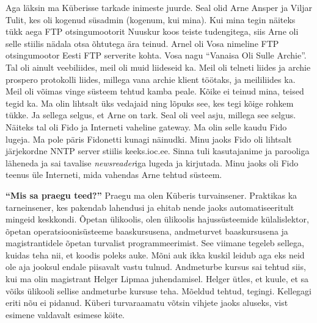 Aga läksin ma Küberisse tarkade inimeste juurde. Seal olid Arne Ansper ja Viljar Tulit, kes oli kogenud süsadmin (kogenum, kui mina). Kui mina tegin näiteks tükk aega FTP otsingumootorit Nuuskur koos teiste tudengitega, siis Arne oli selle stiilis nädala otsa õhtutega ära teinud. Arnel oli Vosa nimeline FTP otsingumootor Eesti FTP serverite kohta. Vosa nagu \enquote{Vanaisa Oli Sulle Archie}. Tal oli ainult veebiliides, meil oli muid liideseid ka. Meil oli telneti liides ja archie prospero protokolli liides, millega vana archie klient töötaks, ja meililiides ka. Meil oli võimas vinge süsteem tehtud kamba peale. Kõike ei teinud mina, teised tegid ka. Ma olin lihtsalt üks vedajaid ning lõpuks see, kes tegi kõige rohkem tükke. Ja sellega selgus, et Arne on tark. Seal oli veel asju, millega see selgus. Näiteks tal oli Fido ja Interneti vaheline gateway. Ma olin selle kaudu Fido lugeja. Ma pole päris Fidonetti kunagi näinudki. Minu jaoks Fido oli lihtsalt järjekordne NNTP server stiilis keeks.ioc.ee. Sinna tuli kasutajanime ja parooliga läheneda ja sai tavalise \emph{newsreader}iga lugeda ja kirjutada. Minu jaoks oli Fido teenus üle Interneti, mida vahendas Arne tehtud süsteem. 

\textbf{\enquote{Mis sa praegu teed?}}
Praegu ma olen Küberis turvainsener. Praktikas ka tarneinsener, kes pakendab lahendusi ja ehitab nende jaoks automatiseeritult mingeid keskkondi. Õpetan ülikoolis, olen ülikoolis hajussüsteemide külalislektor, õpetan operatsioonisüsteeme baaskursusena, andmeturvet baaskursusena ja magistrantidele õpetan turvalist programmeerimist. See viimane tegeleb sellega, kuidas teha nii, et koodis poleks auke. Mõni auk ikka kuskil leidub aga eks neid ole aja jooksul endale piisavalt vastu tulnud. Andmeturbe kursus sai tehtud siis, kui ma olin magistrant Helger Lipmaa juhendamisel. Helger ütles, et kuule, et sa võiks ülikooli  sellise andmeturbe kursuse teha. Mõeldud tehtud, tegingi. Kellegagi eriti nõu ei pidanud. Küberi turvaraamatu võtsin vihjete jaoks aluseks, vist esimene valdavalt esimese köite. 


